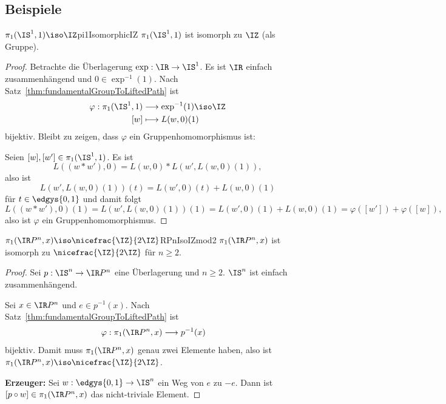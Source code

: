 \documentclass[language=ngerman]{TemplateLecture} %
\begin{document}
\subsection{Beispiele}

\begin{thm}{$\pi_1(\IS^1, 1) \iso \IZ$}{pi1IsomorphicIZ}
    $\pi_1(\IS^1,1)$ ist isomorph zu $\IZ$ (als Gruppe).
\end{thm}
\begin{proof}
    Betrachte die Überlagerung $\exp: \IR \to \IS^1$. Es ist $\IR$ einfach zusammenhängend und $0 \in \exp^{-1}(1)$. Nach Satz~\ref{thm:fundamentalGroupToLiftedPath} ist 
    \begin{align*}
        \varphi: \pi_1(\IS^1, 1) &\longrightarrow \exp^{-1}(1) \iso \IZ \\
        [w] &\longmapsto L(w,0)(1)
    \end{align*}
    bijektiv. Bleibt zu zeigen, dass $\varphi$ ein Gruppenhomomorphismus ist:

    Seien $[w], [w'] \in \pi_1(\IS^1, 1)$. Es ist 
    \begin{equation*}
        L((w * w'), 0) = L(w, 0) * L(w', L(w,0)(1)),
    \end{equation*}
    also ist 
    \begin{equation*}
        L(w',L(w,0)(1))(t) = L(w',0)(t) + L(w,0)(1)
    \end{equation*}
    für $t \in \edgys{0,1}$ und damit folgt 
    \begin{equation*}
        L((w * w'), 0)(1) = L(w', L(w,0)(1))(1) = L(w',0)(1) + L(w,0)(1) = \varphi([w']) + \varphi([w]),
    \end{equation*}
    also ist $\varphi$ ein Gruppenhomomorphismus.
\end{proof}

\begin{thm}{$\pi_1(\IR P^n, x) \iso \nicefrac{\IZ}{2\IZ}$}{RPnIsoIZmod2}
    $\pi_1(\IR P^n, x)$ ist isomorph zu $\nicefrac{\IZ}{2\IZ}$ für $n \geq 2$.
\end{thm}
\begin{proof}
    Sei $p: \IS^n \to \IR P^n$ eine Überlagerung und $n \geq 2$. $\IS^n$ ist einfach zusammenhängend.

    Sei $x \in \IR P^n$ und $e \in p^{-1}(x)$. Nach Satz~\ref{thm:fundamentalGroupToLiftedPath} ist 
    \begin{align*}
        \varphi: \pi_1(\IR P^n, x) &\longrightarrow p^{-1}(x)
    \end{align*}
    bijektiv. Damit muss $\pi_1(\IR P^n, x)$ genau zwei Elemente haben, also ist $\pi_1(\IR P^n, x) \iso \nicefrac{\IZ}{2\IZ}$.

    \textbf{Erzeuger:} Sei $w: \edgys{0,1} \to \IS^n$ ein Weg von $e$ zu $-e$. Dann ist $[p \circ w] \in \pi_1(\IR P^n, x)$ das nicht-triviale Element.
\end{proof}
\end{document}
